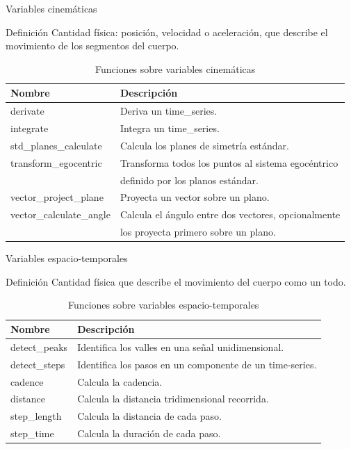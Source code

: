 \documentclass[aspectratio=169,spanish]{beamer} %
\newcommand{\mono}[1]{{\ttfamily #1}}
\begin{document}
\begin{frame}{Variables cinemáticas}
    \begin{block}{Definición}
        Cantidad física: posición, velocidad o aceleración, que describe el movimiento de los segmentos del cuerpo.
    \end{block}
\begin{table}
    \centering
    \caption{Funciones sobre variables cinemáticas}
    \label{tab:kinematics}
    \scriptsize
    \begin{tabular}{ll}
        \toprule
        Nombre & Descripción \\
        \midrule
        \mono{derivate} & Deriva un \mono{time\_series}. \\
        \mono{integrate} & Integra un \mono{time\_series}. \\
        \mono{std\_planes\_calculate} & Calcula los planes de simetría estándar. \\
        \mono{transform\_egocentric} & Transforma todos los puntos al sistema egocéntrico \\ & definido por los planos estándar. \\
        \mono{vector\_project\_plane} & Proyecta un vector sobre un plano. \\
        \mono{vector\_calculate\_angle} & Calcula el ángulo entre dos vectores, opcionalmente \\ & los proyecta primero sobre un plano. \\
        \bottomrule
    \end{tabular}
\end{table}
\end{frame}

\begin{frame}{Variables espacio-temporales}
    \begin{block}{Definición}
        Cantidad física que describe el movimiento del cuerpo como un todo. 
    \end{block}
\begin{table}
    \centering
    \caption{Funciones sobre variables espacio-temporales}
    \label{tab:space-tmp}
    \scriptsize
    \begin{tabular}{ll}
        \toprule
        Nombre & Descripción \\
        \midrule
        \mono{detect\_peaks} & Identifica los valles en una señal unidimensional. \\
        \mono{detect\_steps} & Identifica los pasos en un componente de un time-series. \\
        \mono{cadence} & Calcula la cadencia. \\
        \mono{distance} & Calcula la distancia tridimensional recorrida. \\
        \mono{step\_length} & Calcula la distancia de cada paso. \\
        \mono{step\_time} & Calcula la duración de cada paso. \\
        \bottomrule
    \end{tabular}
\end{table}
\end{frame}
\end{document}
